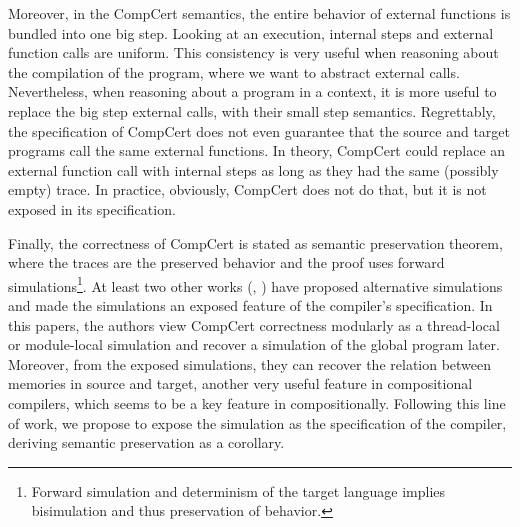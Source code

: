 Moreover, in the CompCert semantics, the entire behavior of external functions is bundled into one big step. Looking at an execution, internal steps and external function calls are uniform. This consistency is very useful when reasoning about the compilation of the program, where we want to abstract external calls. Nevertheless, when reasoning about a program in a context, it is more useful to replace the big step external calls, with their small step semantics. Regrettably, the specification of CompCert does not even guarantee that the source and target programs call the same external functions. In theory, CompCert could replace an external function call with internal steps as long as they had the same (possibly empty) trace. In practice, obviously, CompCert does not do that, but it is not exposed in its specification.

Finally, the correctness of CompCert is stated as semantic preservation theorem, where the traces are the preserved behavior and the proof uses forward simulations\footnote{Forward simulation and determinism of the target language implies bisimulation and thus preservation of behavior.}. At least two other works (\cite{compcomp}, \cite{jiang14:pldi}) have proposed alternative simulations and made the simulations an exposed feature of the compiler's specification. In this papers, the authors view CompCert correctness modularly as a thread-local or module-local simulation and recover a simulation of the global program later. Moreover, from the exposed simulations, they can recover the relation between memories in source and target, another very useful feature in compositional compilers, which seems to be a key feature in compositionally. Following this line of work, we propose to expose the simulation as the specification of the compiler, deriving semantic preservation as a corollary. 
 
